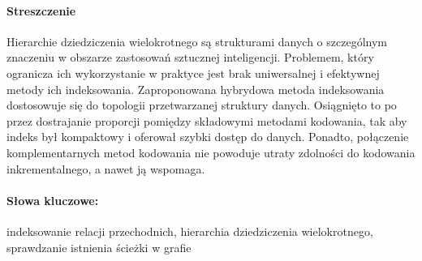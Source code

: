 \paragraph{Streszczenie} Hierarchie dziedziczenia wielokrotnego są strukturami danych o szczególnym znaczeniu w
obszarze zastosowań sztucznej inteligencji. Problemem, który ogranicza ich wykorzystanie w praktyce jest brak
uniwersalnej i efektywnej metody ich indeksowania. Zaproponowana hybrydowa metoda indeksowania dostosowuje się do
topologii przetwarzanej struktury danych. Osiągnięto to po przez dostrajanie proporcji pomiędzy składowymi metodami
kodowania, tak aby indeks był kompaktowy i oferował szybki dostęp do danych. Ponadto, połączenie komplementarnych metod
kodowania nie powoduje utraty zdolności do kodowania inkrementalnego, a nawet ją wspomaga.


\paragraph{Słowa kluczowe:} indeksowanie relacji przechodnich, hierarchia dziedziczenia wielokrotnego, sprawdzanie
istnienia ścieżki w grafie


